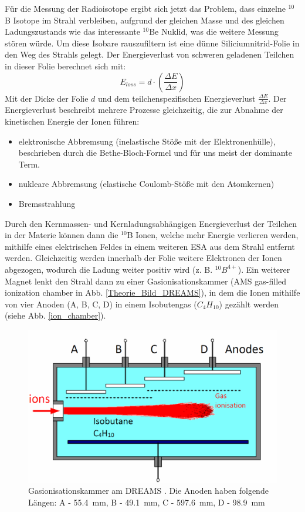 Für die Messung der Radioisotope ergibt sich jetzt das Problem, dass einzelne $^{10}$B Isotope im Strahl verbleiben, aufgrund der gleichen Masse und des gleichen Ladungszustands wie das interessante $^{10}$Be Nuklid, was die weitere Messung stören würde.
Um diese Isobare rauszufiltern ist eine dünne Siliciumnitrid-Folie in den Weg des Strahls gelegt.
Der Energieverlust von schweren geladenen Teilchen in dieser Folie berechnet sich mit:
\begin{equation}
E_{loss} = d \cdot \left( \frac{\Delta E}{\Delta x} \right)
\end{equation}
Mit der Dicke der Folie $d$ und dem teilchenspezifischen Energieverlust $\frac{\Delta E}{\Delta x}$.
Der Energieverlust beschreibt mehrere Prozesse gleichzeitig, die zur Abnahme der kinetischen Energie der Ionen führen:
\begin{itemize}
    \item elektronische Abbremsung (inelastische Stöße mit der Elektronenhülle), beschrieben durch die Bethe-Bloch-Formel und für uns meist der dominante Term.
    \item nukleare Abbremsung (elastische Coulomb-Stöße mit den Atomkernen)
    \item Bremsstrahlung
\end{itemize}
Durch den Kernmassen- und Kernladungsabhängigen Energieverlust der Teilchen in der Materie können dann die $^{10}$B Ionen, welche mehr Energie verlieren werden, mithilfe eines elektrischen Feldes in einem weiteren ESA aus dem Strahl entfernt werden.
Gleichzeitig werden innerhalb der Folie weitere Elektronen der Ionen abgezogen, wodurch die Ladung weiter positiv wird (z. B. $^{10}B^{4+}$).
Ein weiterer Magnet lenkt den Strahl dann zu einer Gasionisationskammer (AMS gas-filled ionization chamber in Abb. \ref{Theorie_Bild_DREAMS}), in dem die Ionen mithilfe von vier Anoden (A, B, C, D) in einem Isobutengas ($C_{4}H_{10}$) gezählt werden (siehe Abb. \ref{ion_chamber}).
\begin{figure}[ht]
  \includegraphics[width=0.95\linewidth]{../Bilder/ion_chamber.png}
  \caption{Gasionisationskammer am DREAMS \cite{Bild_Ionisationskammer}. Die Anoden haben folgende Längen: A - \SI{55.4}{\milli\metre}, B - \SI{49.1}{\milli\metre}, C - \SI{597.6}{\milli\metre}, D - \SI{98.9}{\milli\metre}}
  \label{Theorie_ion_chamber}
\end{figure}
\clearpage
